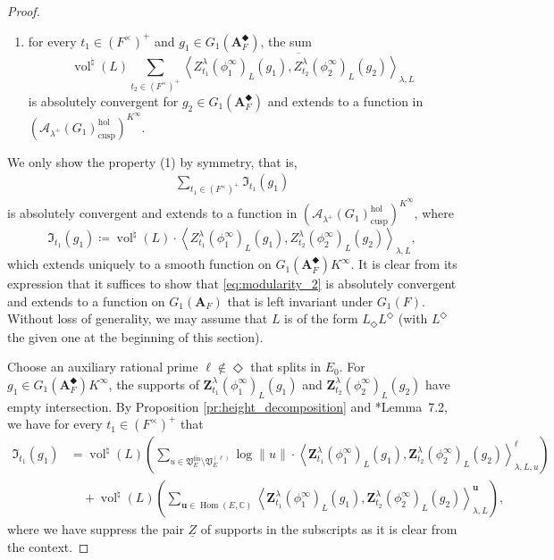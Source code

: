 \documentclass[12pt]{amsart}
\numberwithin{equation}{section}
\theoremstyle{plain}
\theoremstyle{definition}
\theoremstyle{remark}
\renewcommand{\b}[1]{\mathbf{#1}}
\renewcommand{\c}[1]{\mathcal{#1}}
\renewcommand{\d}[1]{\mathbb{#1}}
\newcommand{\f}[1]{\mathfrak{#1}}
\renewcommand{\r}[1]{\mathrm{#1}}
\renewcommand{\(}{\left(}
\renewcommand{\)}{\right)}
\newcommand{\ol}[1]{\overline{#1}{}}
\newcommand{\ul}{\underline}
\newcommand{\bA}{\b A}
\newcommand{\cA}{\c A}
\newcommand{\dC}{\d C}
\newcommand{\fI}{\f I}
\newcommand{\fV}{\f V}
\newcommand{\bbu}{\boldsymbol{u}}
\newcommand{\bbZ}{\boldsymbol{Z}}
\newcommand{\llangle}{\left\langle}
\newcommand{\rrangle}{\right\rangle}
\newcommand{\cusp}{\r{cusp}}
\newcommand{\fin}{\r{fin}}
\newcommand{\hol}{\r{hol}}
\DeclareMathOperator{\Hom}{Hom}
\DeclareMathOperator{\vol}{vol}
\begin{document}
\begin{proof}
\begin{enumerate}
  \item for every $t_1\in(F^\times)^+$ and $g_1\in G_1(\bA_F^\Diamondblack)$, the sum
      \[
      \vol^\natural(L)\sum_{t_2\in(F^\times)^+}
      \ol{\llangle Z^\lambda_{t_1}(\phi^\infty_1)_L(g_1),Z^\lambda_{t_2}(\phi^\infty_2)_L(g_2)\rrangle_{\lambda,L}}
      \]
      is absolutely convergent for $g_2\in G_1(\bA_F^\Diamondblack)$ and extends to a function in $(\cA_{\lambda^+}(G_1)_\cusp^\hol)^{K^\infty}$.
\end{enumerate}
We only show the property (1) by symmetry, that is,
\begin{align}\label{eq:modularity_2}
\sum_{t_1\in(F^\times)^+}\fI_{t_1}(g_1)
\end{align}
is absolutely convergent and extends to a function in $(\cA_{\lambda^+}(G_1)_\cusp^\hol)^{K^\infty}$, where
\[
\fI_{t_1}(g_1)\coloneqq\vol^\natural(L)\cdot
\llangle Z^\lambda_{t_1}(\phi^\infty_1)_L(g_1),Z^\lambda_{t_2}(\phi^\infty_2)_L(g_2)\rrangle_{\lambda,L},
\]
which extends uniquely to a smooth function on $G_1(\bA_F^\Diamondblack)K^\infty$. It is clear from its expression that it suffices to show that \eqref{eq:modularity_2} is absolutely convergent and extends to a function on $G_1(\bA_F)$ that is left invariant under $G_1(F)$. Without loss of generality, we may assume that $L$ is of the form $L_\Diamond L^\Diamond$ (with $L^\Diamond$ the given one at the beginning of this section).

Choose an auxiliary rational prime $\ell\not\in\Diamond$ that splits in $E_0$. For $g_1\in G_1(\bA_F^\Diamondblack)K^\infty$, the supports of $\bbZ^\lambda_{t_1}(\phi^\infty_1)_L(g_1)$ and $\bbZ^\lambda_{t_2}(\phi^\infty_2)_L(g_2)$ have empty intersection. By Proposition \ref{pr:height_decomposition} and \cite{LL21}*{Lemma~7.2}, we have for every $t_1\in(F^\times)^+$ that
\begin{align*}
\fI_{t_1}(g_1)
&=\vol^\natural(L)\(\sum_{u\in\fV_E^\fin\setminus\fV_E^{(\ell)}}\log\|u\|\cdot\llangle \bbZ^\lambda_{t_1}(\phi^\infty_1)_L(g_1),\bbZ^\lambda_{t_2}(\phi^\infty_2)_L(g_2)\rrangle_{\lambda,L,u}^\ell\) \\
&\quad +\vol^\natural(L)\(\sum_{\bbu\in\Hom(E,\dC)}\llangle \bbZ^\lambda_{t_1}(\phi^\infty_1)_L(g_1),\bbZ^\lambda_{t_2}(\phi^\infty_2)_L(g_2)\rrangle_{\lambda,L}^{\bbu}\),
\end{align*}
where we have suppress the pair $\ul{Z}$ of supports in the subscripts as it is clear from the context.


\end{proof}
\end{document}
